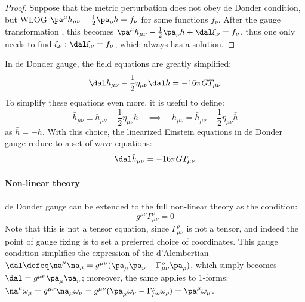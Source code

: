 \begin{proofbox}
  \begin{proof}
    Suppose that the metric perturbation does not obey de Donder condition, but WLOG $ \pa^\mu h_{\mu \nu} - \frac{1}{2} \pa_\nu h = f_\nu $ for some functions $ f_\nu $. After the gauge transformation , this becomes $ \pa^\mu h_{\mu \nu} - \frac{1}{2} \pa_\nu h + \dal \xi_\nu = f_\nu $, thus one only needs to find $ \xi_\nu : \dal \xi_\nu = f_\nu $, which always has a solution.
  \end{proof}
\end{proofbox}

In de Donder gauge, the field equations  are greatly simplified:
\begin{equation}
  \dal h_{\mu \nu} - \frac{1}{2} \eta_{\mu \nu} \dal h = -16\pi G T_{\mu \nu}
\end{equation}
To simplify these equations even more, it is useful to define:
\begin{equation*}
  \bar{h}_{\mu \nu} \equiv h_{\mu \nu} - \frac{1}{2} \eta_{\mu \nu} h
  \quad \implies \quad
  h_{\mu \nu} = \bar{h}_{\mu \nu} - \frac{1}{2} \eta_{\mu \nu} \bar{h}
\end{equation*}
as $ \bar{h} = - h $. With this choice, the linearized Einstein equations in de Donder gauge reduce to a set of wave equations:
\begin{equation}
  \dal \bar{h}_{\mu \nu} = -16\pi G T_{\mu \nu}
  \label{eq:weak-wave-feq}
\end{equation}

\paragraph{Non-linear theory}

de Donder gauge can be extended to the full non-linear theory as the condition:
\begin{equation}
  g^{\mu \nu} \Gamma^\rho_{\mu \nu} = 0
\end{equation}
Note that this is not a tensor equation, since $ \Gamma^\rho_{\mu \nu} $ is not a tensor, and indeed the point of gauge fixing is to set a preferred choice of coordinates. This gauge condition simplifies the expression of the d'Alembertian $ \dal \defeq \na^\mu \na_\mu = g^{\mu \nu} ( \pa_\mu \pa_\nu - \Gamma^\rho_{\mu \nu} \pa_\rho ) $, which simply becomes $ \dal = g^{\mu \nu} \pa_\mu \pa_\nu $; moreover, the same applies to 1-forms: $ \na^\mu \omega_\mu = g^{\mu \nu} \na_\mu \omega_\nu = g^{\mu \nu} ( \pa_\mu \omega _\nu - \Gamma^\rho_{\mu \nu} \omega_\rho ) = \pa^\mu \omega_\mu $.

